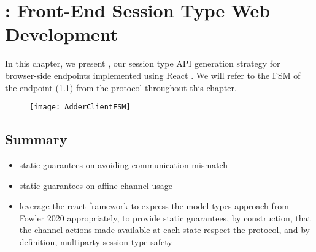 \chapter{: Front-End Session Type Web Development}
\label{chap:react}

In this chapter, we present ,
our session type API generation strategy for browser-side endpoints
implemented using React \cite{React}.
We will refer to the FSM of the 
endpoint (\cref{fig:adderclientfsm})
from the  protocol 
throughout this chapter.

\begin{figure}[!b]
\centering
\texttt{[image: AdderClientFSM]}
\label{fig:adderclientfsm}
\end{figure}








\section{Summary}
\begin{itemize}
\item static guarantees on avoiding communication mismatch
\item static guarantees on affine channel usage
\item leverage the react framework to express the model types approach from Fowler 2020 appropriately, to provide static guarantees, by construction, that the channel actions made available at each state respect the protocol, and by definition, multiparty session type safety
\end{itemize}